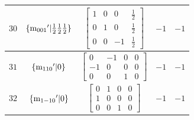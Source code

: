 \documentclass[fleqn,8pt]{jsarticle}
\begin{document}
\begin{longtable}{ccccc}
$ 30 $ & $ \{{\rm m}_{001}{}'|\frac{1}{2} \frac{1}{2} \frac{1}{2}\} $ & $ \begin{bmatrix} 1 & 0 & 0 & \frac{1}{2} \\ 0 & 1 & 0 & \frac{1}{2} \\ 0 & 0 & -1 & \frac{1}{2} \end{bmatrix} $ & $ -1 $ & $ -1 $ \\ \hline
$ 31 $ & $ \{{\rm m}_{110}{}'|0\} $ & $ \begin{bmatrix} 0 & -1 & 0 & 0 \\ -1 & 0 & 0 & 0 \\ 0 & 0 & 1 & 0 \end{bmatrix} $ & $ -1 $ & $ -1 $ \\ \hline
$ 32 $ & $ \{{\rm m}_{1-10}{}'|0\} $ & $ \begin{bmatrix} 0 & 1 & 0 & 0 \\ 1 & 0 & 0 & 0 \\ 0 & 0 & 1 & 0 \end{bmatrix} $ & $ -1 $ & $ -1 $ \\
\end{longtable}
\end{document}

